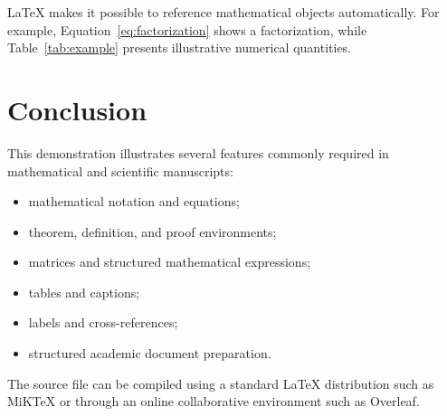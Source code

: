 \documentclass[12pt,a4paper]{article}
\theoremstyle{definition}
\begin{document}
LaTeX makes it possible to reference mathematical objects
automatically. For example, Equation~\eqref{eq:factorization}
shows a factorization, while Table~\ref{tab:example} presents
illustrative numerical quantities.

\section{Conclusion}

This demonstration illustrates several features commonly required
in mathematical and scientific manuscripts:

\begin{itemize}
    \item mathematical notation and equations;
    \item theorem, definition, and proof environments;
    \item matrices and structured mathematical expressions;
    \item tables and captions;
    \item labels and cross-references;
    \item structured academic document preparation.
\end{itemize}

The source file can be compiled using a standard LaTeX distribution
such as MiKTeX or through an online collaborative environment such
as Overleaf.
\end{document}
